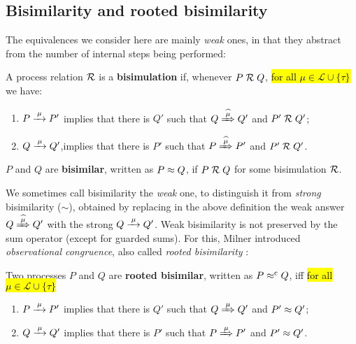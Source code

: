 \subsection{Bisimilarity and rooted bisimilarity}
\label{ss:BiEx}

The equivalences we consider here are mainly \emph{weak} ones, in that they
abstract from the number of internal steps being performed:
\begin{definition}%
\label{d:wb}
A process relation ${{\cal R}}$ is a \textbf{bisimulation} if, whenever
 $P\mathrel{\cal R} Q$, \hl{for all $\mu\in \mathscr{L}\cup\{\tau\}$} we have:
\begin{enumerate}
\item $P \arr\mu P'$ implies that there is $Q'$ such that $Q \Arcap \mu Q'$ and $P' \mathrel{\cal R} Q'$;
\item $Q \arr\mu Q'$,implies that there is $P'$ such that $P \Arcap
  \mu P'$ and $P' \mathrel{\cal R} Q'$\enspace.
\end{enumerate}
 $P$ and $Q$ are \textbf{bisimilar},
written as $P \approx Q$, if $P \mathrel{\cal R} Q$ for some bisimulation ${\cal R}$.
\end{definition}

We sometimes call bisimilarity the \emph{weak} one, to
distinguish it from \emph{strong} bisimilarity ($\sim$),
obtained by replacing in the above definition   the weak answer $
Q\Arcap\mu Q'$ with the strong  $Q \arr \mu Q'$.
Weak bisimilarity is not preserved by the sum operator (except for
guarded sums). For this, Milner introduced \emph{observational congruence}, also called \emph{rooted
  bisimilarity} \cite{Gorrieri:2015jt,Sangiorgi:2011ut}:
\begin{definition}%
\label{d:rootedBisimilarity}
Two processes $P$ and $Q$ are \textbf{rooted bisimilar}, written as $P
\mathrel{\approx^{\rm{c}}} Q$, iff \hl{for all $\mu\in \mathscr{L}\cup\{\tau\}$}
\begin{enumerate}
 \item  $P \arr\mu P'$ implies that there is $Q'$ such that $Q
   \Arr\mu Q'$ and $P' \approx Q'$;
 \item  $Q \arr\mu Q'$ implies that there is $P'$ such that $P
   \Arr\mu P'$ and $P' \approx Q'$\enspace.
\end{enumerate}
\end{definition}

